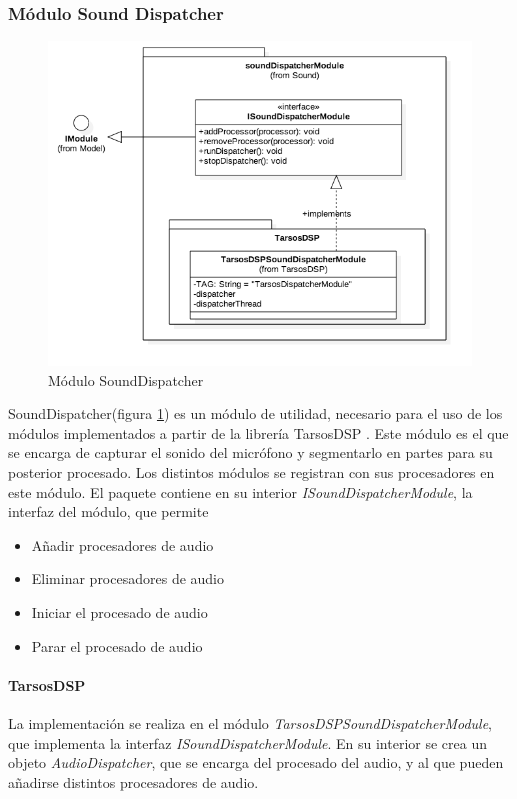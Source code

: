 \subsubsection{Módulo Sound Dispatcher}
\begin{figure}
	\centering
	\includegraphics[width=1\linewidth]{imagenes/diagramas/SoundDispatcherModule.png}
	\caption{Módulo SoundDispatcher}
	\label{fig:sound-dispatcher-module}
\end{figure}
SoundDispatcher(figura \ref{fig:sound-dispatcher-module}) es un módulo de utilidad, necesario para el uso de los módulos implementados a partir de la librería TarsosDSP \cite{six2014tarsosdsp}.
Este módulo es el que se encarga de capturar el sonido del micrófono y segmentarlo en partes para su posterior procesado. Los distintos módulos se registran con sus procesadores en este módulo.
El paquete contiene en su interior \textit{ISoundDispatcherModule}, la interfaz del módulo, que permite
\begin{itemize}
	\item Añadir procesadores de audio
	\item Eliminar procesadores de audio
	\item Iniciar el procesado de audio
	\item Parar el procesado de audio
\end{itemize}

\paragraph*{TarsosDSP\\}
La implementación se realiza en el módulo \textit{TarsosDSPSoundDispatcherModule}, que implementa la interfaz \textit{ISoundDispatcherModule}.
En su interior se crea un objeto \textit{AudioDispatcher}, que se encarga del procesado del audio, y al que pueden añadirse distintos procesadores de audio.

